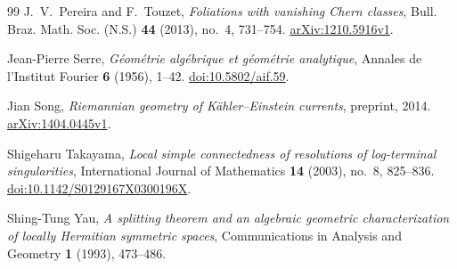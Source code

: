\begin{thebibliography}{99}
J.~V.~Pereira and F.~Touzet,
\emph{Foliations with vanishing Chern classes},
Bull. Braz. Math. Soc. (N.S.) \textbf{44} (2013), no.~4, 731--754.
\href{https://arxiv.org/abs/1210.5916v1}{arXiv:1210.5916v1}.

Jean-Pierre Serre,
\emph{G\'eom\'etrie alg\'ebrique et g\'eom\'etrie analytique},
Annales de l'Institut Fourier \textbf{6} (1956), 1--42.
\href{https://doi.org/10.5802/aif.59}{doi:10.5802/aif.59}.

Jian Song,
\emph{Riemannian geometry of K\"ahler--Einstein currents},
preprint, 2014.
\href{https://arxiv.org/abs/1404.0445v1}{arXiv:1404.0445v1}.

Shigeharu Takayama,
\emph{Local simple connectedness of resolutions of log-terminal singularities},
International Journal of Mathematics \textbf{14} (2003), no.~8, 825--836.
\href{https://doi.org/10.1142/S0129167X0300196X}{doi:10.1142/S0129167X0300196X}.

Shing-Tung Yau,
\emph{A splitting theorem and an algebraic geometric characterization of
locally Hermitian symmetric spaces},
Communications in Analysis and Geometry \textbf{1} (1993), 473--486.

\end{thebibliography}
